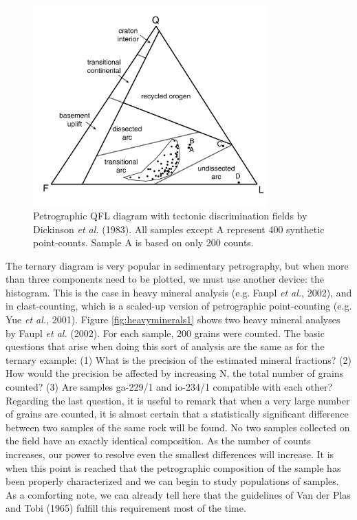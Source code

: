 \documentclass{article}
\begin{document}
\begin{figure}[h]
  \centering
  \includegraphics[width=9cm]{QFLa.pdf}
  \caption{Petrographic QFL diagram with tectonic discrimination fields
by Dickinson {\it  et al.} (1983). All samples  except A represent 400
synthetic point-counts. Sample A is based on only 200 counts.}
  \label{fig:QFLa}
\end{figure}

The ternary  diagram is very  popular in sedimentary  petrography, but
when  more than  three  components need  to  be plotted,  we must  use
another  device: the  histogram.  This  is the  case in  heavy mineral
analysis (e.g. Faupl {\it et al.}, 2002), and in clast-counting, which
is a  scaled-up version of petrographic point-counting  (e.g. Yue {\it
et  al.},  2001).   Figure  \ref{fig:heavyminerals1} shows  two  heavy
mineral analyses by  Faupl {\it et al.} (2002).   For each sample, 200
grains were counted.   The basic questions that arise  when doing this
sort of analysis are the same  as for the ternary example: (1) What is
the precision  of the estimated  mineral fractions? (2) How  would the
precision  be affected  by increasing  N, the  total number  of grains
counted? (3)  Are samples ga-229/1  and io-234/1 compatible  with each
other?  Regarding the last question,  it is useful to remark that when
a very large number of grains are counted, it is almost certain that a
statistically significant  difference between two samples  of the same
rock will  be found.  No  two samples collected  on the field  have an
exactly identical composition. As  the number of counts increases, our
power to resolve  even the smallest differences will  increase.  It is
when this  point is reached  that the petrographic composition  of the
sample  has been  properly characterized  and  we can  begin to  study
populations of samples. As a comforting note, we can already tell here
that  the guidelines  of Van  der Plas  and Tobi  (1965)  fulfill this
requirement most of the time.
\end{document}
